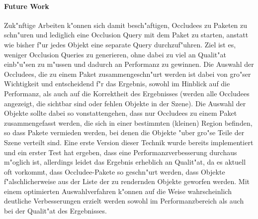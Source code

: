\documentclass[journal]{vgtc}
\begin{document}
\paragraph{Future Work} Zuk"nftige Arbeiten k"onnen sich damit besch"aftigen, Occludees zu Paketen zu schn"uren und lediglich eine Occlusion Query mit dem Paket zu starten, anstatt wie bisher f"ur jedes Objekt eine separate Query durchzuf"uhren.
Ziel ist es, weniger Occlusion Queries zu generieren, ohne dabei zu viel an Qualit"at einb"u"sen zu m"ussen und dadurch an Performanz zu gewinnen.
Die Auswahl der Occludees, die zu einem Paket zusammengeschn"urt werden ist dabei von gro"ser Wichtigkeit und entscheidend f"r das Ergebnis, sowohl im Hinblick auf die Performanz, als auch auf die Korrektheit des Ergebnisses (werden alle Occludees angezeigt, die sichtbar sind oder fehlen Objekte in der Szene).
Die Auswahl der Objekte sollte dabei so vonstattengehen, dass nur Occludees zu einem Paket zusammengefasst werden, die sich in einer bestimmten (kleinen) Region befinden, so dass Pakete vermieden werden, bei denen die Objekte "uber gro"se Teile der Szene verteilt sind.
Eine erste Version dieser Technik wurde bereits implementiert und ein erster Test hat ergeben, dass eine Performanzverbesserung durchaus m"oglich ist, allerdings leidet das Ergebnis erheblich an Qualit"at, da es aktuell oft vorkommt, dass Occludee-Pakete so geschn"urt werden, dass Objekte f"alschlicherweise aus der Liste der zu rendernden Objekte geworfen werden.
Mit einem optimierten Auswahlverfahren k"onnen auf die Weise wahrscheinlich deutliche Verbesserungen erzielt werden sowohl im Performanzbereich als auch bei der Qualit"at des Ergebnisses. 

 

\end{document}
